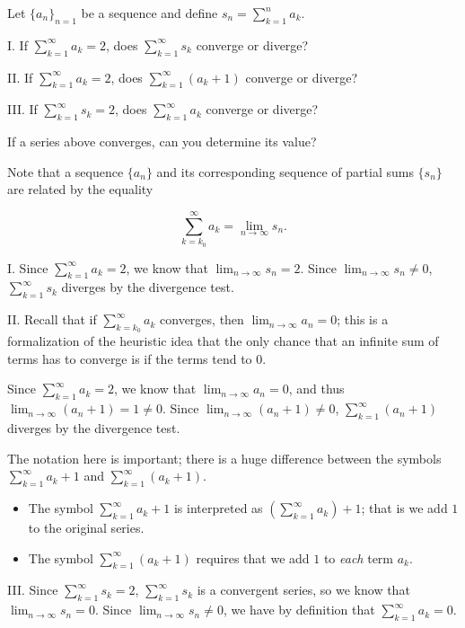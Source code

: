 \documentclass[noauthor]{ximera}
\begin{document}
\begin{problem}
Let $\{a_n\}_{n=1}$ be a sequence and define $s_n = \sum_{k=1}^n a_k$.  

I. If $\sum_{k=1}^{\infty} a_k =2$, does $\sum_{k=1}^{\infty} s_k$ converge or diverge?  

II. If $\sum_{k=1}^{\infty} a_k =2$, does $\sum_{k=1}^{\infty} (a_k+1)$ converge or diverge?  

III. If $\sum_{k=1}^{\infty} s_k =2$, does $\sum_{k=1}^{\infty} a_k$ converge or diverge?  

If a series above converges, can you determine its value? 

\begin{freeResponse}
Note that a sequence $\{a_n\}$ and its corresponding sequence of partial sums $\{s_n\}$ are related by the equality

\[
\sum_{k=k_0}^{\infty} a_k = \lim_{n \to \infty} s_n.
\] 

I. Since $\sum_{k=1}^{\infty} a_k =2$, we know that $ \lim_{n \to \infty} s_n = 2$.  Since $ \lim_{n \to \infty} s_n \neq 0$, $\sum_{k=1}^{\infty} s_k$ diverges by the divergence test.

II. Recall that if $\sum_{k=k_0}^{\infty} a_k$ converges, then $\lim_{n \to \infty} a_n = 0$; this is a formalization of the heuristic idea that the only chance that an infinite sum of terms has to converge is if the terms tend to $0$.

Since $\sum_{k=1}^{\infty} a_k =2$, we know that $ \lim_{n \to \infty} a_n = 0$, and thus $\lim_{n \to \infty} \left(a_n+1\right)  = 1 \neq 0$.  Since $ \lim_{n \to \infty}\left(a_n+1\right) \neq 0$, $\sum_{k=1}^{\infty} \left(a_n+1\right) $ diverges by the divergence test.

\begin{remark}
The notation here is important; there is a huge difference between the symbols $\sum_{k=1}^{\infty} a_k+1$ and $\sum_{k=1}^{\infty} (a_k+1)$.  

\begin{itemize} 
\item The symbol $\sum_{k=1}^{\infty} a_k+1$ is interpreted as $\left( \sum_{k=1}^{\infty} a_k\right)+1$; that is we add $1$ to the original series.
\item The symbol $\sum_{k=1}^{\infty} (a_k+1)$ requires that we add $1$ to \emph{each} term $a_k$.
\end{itemize}
\end{remark}
\end{freeResponse}

III. Since $\sum_{k=1}^{\infty} s_k =2$, $\sum_{k=1}^{\infty} s_k$ is a convergent series, so we know that $ \lim_{n \to \infty} s_n = 0$.  Since $ \lim_{n \to \infty} s_n \neq 0$, we have by definition that $\sum_{k=1}^{\infty} a_k =0$.
\end{problem}
\end{document}
